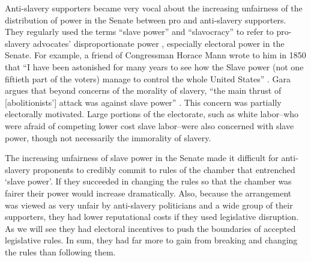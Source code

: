 \documentclass[a4paper]{article}\usepackage[]{graphicx}\usepackage[]{color}
\begin{document}
Anti-slavery supporters became very vocal about the increasing unfairness of the distribution of power in the Senate between pro and anti-slavery supporters. They regularly used the terms ``slave power'' and ``slavocracy'' to refer to pro-slavery advocates' disproportionate power \citep{richards2000}, especially electoral power in the Senate. For example, a friend of Congressman Horace Mann wrote to him in 1850 that ``I have been astonished for many years to see how the Slave power (not one fiftieth part of the voters) manage to control the whole United States'' \citep[quoted in][6]{Gara1969}. Gara argues that beyond concerns of the morality of slavery, ``the main thrust of [abolitionists'] attack was against slave power'' \citeyearpar[6]{Gara1969}. This concern was partially electorally motivated. Large portions of the electorate, such as white labor--who were afraid of competing lower cost slave labor--were also concerned with slave power, though not necessarily the immorality of slavery.

The increasing unfairness of slave power in the Senate made it difficult for anti-slavery proponents to credibly commit to rules of the chamber that entrenched `slave power'. If they succeeded in changing the rules so that the chamber was fairer their power would increase dramatically. Also, because the arrangement was viewed as very unfair by anti-slavery politicians and a wide group of their supporters, they had lower reputational costs if they used legislative disruption. As we will see they had electoral incentives to push the boundaries of accepted legislative rules. In sum, they had far more to gain from breaking and changing the rules than following them.
\end{document}
